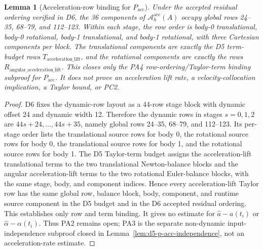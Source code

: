 \documentclass[preprint,12pt]{elsarticle}
\newtheorem{lemma}{Lemma}
\begin{document}
\begin{lemma}[Acceleration-row binding for \(P_{\mathrm{acc}}\)]
\label{lem:d5-p-acc-row-binding}
Under the accepted residual ordering verified in D6, the 36 components of
\(\mathcal A_h^{\mathrm{acc}}(A)\) occupy global rows 24--35, 68--79, and
112--123.  Within each stage, the row order is body-0 translational,
body-0 rotational, body-1 translational, and body-1 rotational, with three
Cartesian components per block.  The translational components are exactly the
D5 term-budget rows \(T_{\mathrm{acceleration\_lift}}\), and the rotational
components are exactly the rows
\(R_{\mathrm{angular\_acceleration\_lift}}\). This closes only the PA4
row-ordering/Taylor-term binding subproof for \(P_{\mathrm{acc}}\). It does
not prove an acceleration lift rate, a velocity-collocation implication, a
Taylor bound, or PC2.
\end{lemma}

\begin{proof}
D6 fixes the dynamic-row layout as a 44-row stage block with dynamic offset
24 and dynamic width 12.  Therefore the dynamic rows in stages
\(s=0,1,2\) are \(44s+24,\ldots,44s+35\), namely global rows 24--35, 68--79,
and 112--123.  Its per-stage order lists the translational source rows for
body 0, the rotational source rows for body 0, the translational source rows
for body 1, and the rotational source rows for body 1.  The D5 Taylor-term
budget assigns the acceleration-lift translational terms to the two
translational Newton-balance blocks and the angular acceleration-lift terms
to the two rotational Euler-balance blocks, with the same stage, body, and
component indices.  Hence every acceleration-lift Taylor row has the same
global row, balance block, body, component, and runtime source component in
the D5 budget and in the D6 accepted residual ordering. This establishes only
row and term binding.  It gives no estimate for
\(\widehat a-a(t_i)\) or \(\widehat\alpha-\alpha(t_i)\).  Thus PA2 remains
open; PA3 is the separate non-dynamic input-independence subproof closed in
Lemma~\ref{lem:d5-p-acc-independence}, not an acceleration-rate estimate.
\end{proof}
\end{document}
